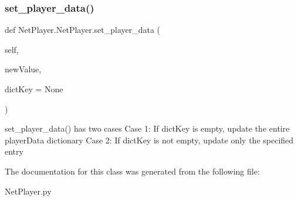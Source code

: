 \subsubsection{\texorpdfstring{set\+\_\+player\+\_\+data()}{set\_player\_data()}}
{\footnotesize\ttfamily def Net\+Player.\+Net\+Player.\+set\+\_\+player\+\_\+data (\begin{DoxyParamCaption}\item[{}]{self,  }\item[{}]{new\+Value,  }\item[{}]{dict\+Key = {\ttfamily None} }\end{DoxyParamCaption})}

\begin{DoxyVerb}set_player_data() has two cases
    Case 1: If dictKey is empty, update the entire playerData dictionary
    Case 2: If dictKey is not empty, update only the specified entry
\end{DoxyVerb}
 

The documentation for this class was generated from the following file\+:\begin{DoxyCompactItemize}
\item 
Net\+Player.\+py\end{DoxyCompactItemize}
